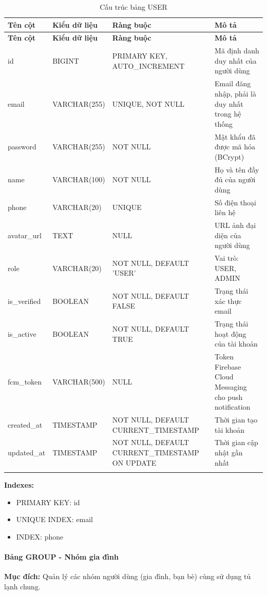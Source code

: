\small
\begin{longtable}{|>{\raggedright\arraybackslash}p{3.5cm}|>{\raggedright\arraybackslash}p{3cm}|>{\raggedright\arraybackslash}p{4cm}|>{\raggedright\arraybackslash}p{4cm}|}
\hline
\textbf{Tên cột} & \textbf{Kiểu dữ liệu} & \textbf{Ràng buộc} & \textbf{Mô tả} \\
\hline
\endfirsthead
\hline
\textbf{Tên cột} & \textbf{Kiểu dữ liệu} & \textbf{Ràng buộc} & \textbf{Mô tả} \\
\hline
\endhead
id & BIGINT & PRIMARY KEY, AUTO\_INCREMENT & Mã định danh duy nhất của người dùng \\
\hline
email & VARCHAR(255) & UNIQUE, NOT NULL & Email đăng nhập, phải là duy nhất trong hệ thống \\
\hline
password & VARCHAR(255) & NOT NULL & Mật khẩu đã được mã hóa (BCrypt) \\
\hline
name & VARCHAR(100) & NOT NULL & Họ và tên đầy đủ của người dùng \\
\hline
phone & VARCHAR(20) & UNIQUE & Số điện thoại liên hệ \\
\hline
avatar\_url & TEXT & NULL & URL ảnh đại diện của người dùng \\
\hline
role & VARCHAR(20) & NOT NULL, DEFAULT 'USER' & Vai trò: USER, ADMIN \\
\hline
is\_verified & BOOLEAN & NOT NULL, DEFAULT FALSE & Trạng thái xác thực email \\
\hline
is\_active & BOOLEAN & NOT NULL, DEFAULT TRUE & Trạng thái hoạt động của tài khoản \\
\hline
fcm\_token & VARCHAR(500) & NULL & Token Firebase Cloud Messaging cho push notification \\
\hline
created\_at & TIMESTAMP & NOT NULL, DEFAULT CURRENT\_TIMESTAMP & Thời gian tạo tài khoản \\
\hline
updated\_at & TIMESTAMP & NOT NULL, DEFAULT CURRENT\_TIMESTAMP ON UPDATE & Thời gian cập nhật gần nhất \\
\hline
\caption{Cấu trúc bảng USER}
\end{longtable}

\textbf{Indexes:}
\begin{itemize}
    \item PRIMARY KEY: id
    \item UNIQUE INDEX: email
    \item INDEX: phone
\end{itemize}

\paragraph{Bảng GROUP - Nhóm gia đình}
\textbf{Mục đích:} Quản lý các nhóm người dùng (gia đình, bạn bè) cùng sử dụng tủ lạnh chung.


